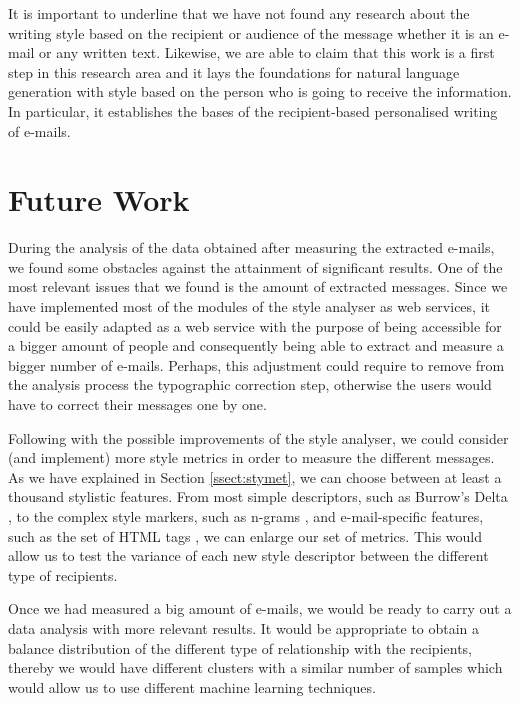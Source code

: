 It is important to underline that we have not found any research about the writing style based on the recipient or audience of the message whether it is an e-mail or any written text. Likewise, we are able to claim that this work is a first step in this research area and it lays the foundations for natural language generation with style based on the person who is going to receive the information. In particular, it establishes the bases of the recipient-based personalised writing of e-mails.

\section{Future Work}\label{sect:future}
During the analysis of the data obtained after measuring the extracted e-mails, we found some obstacles against the attainment of significant results. One of the most relevant issues that we found is the amount of extracted messages. Since we have implemented most of the modules of the style analyser as web services, it could be easily adapted as a web service with the purpose of being accessible for a bigger amount of people and consequently being able to extract and measure a bigger number of e-mails. Perhaps, this adjustment could require to remove from the analysis process the typographic correction step, otherwise the users would have to correct their messages one by one.

Following with the possible improvements of the style analyser, we could consider (and implement) more style metrics in order to measure the different messages. As we have explained in Section \ref{ssect:stymet}, we can choose between at least a thousand stylistic features. From most simple descriptors, such as Burrow's Delta \citep{burrows2002delta}, to the complex style markers, such as n-grams \citep{brocardo2013authorship}, and e-mail-specific features, such as the set of HTML tags \citep{de2001mining}, we can enlarge our set of metrics. This would allow us to test the variance of each new style descriptor between the different type of recipients.

Once we had measured a big amount of e-mails, we would be ready to carry out a data analysis with more relevant results. It would be appropriate to obtain a balance distribution of the different type of relationship with the recipients, thereby we would have different clusters with a similar number of samples which would allow us to use different machine learning techniques.

